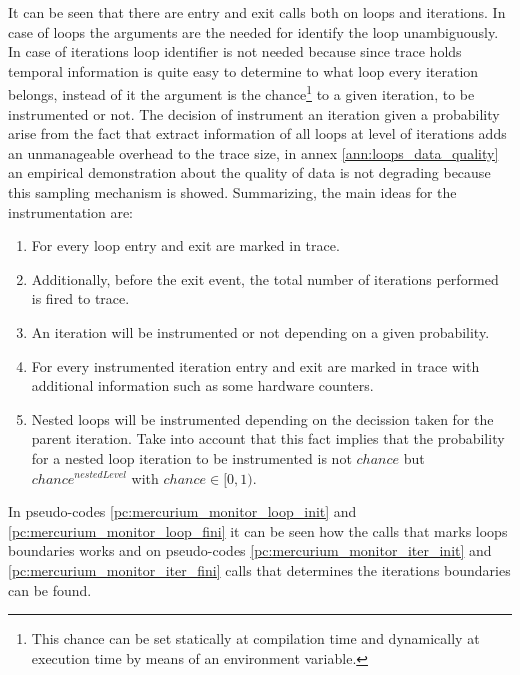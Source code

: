 It can be seen that there are entry and exit calls both on
loops and iterations. In case of loops the arguments are the needed for identify
the loop unambiguously. In case of iterations loop identifier is not needed
because since trace holds temporal information is quite easy to determine to
what loop every iteration belongs, instead of it the argument is the
chance\footnote{This chance can be set statically at compilation time and
dynamically at execution time by means of an environment variable.} to a
given iteration, to be instrumented or not. The decision of
instrument an iteration given a probability arise from the fact that extract
information of all loops at level of iterations adds an unmanageable overhead to
the trace size, in annex \ref{ann:loops_data_quality} an empirical demonstration 
about the quality of data is not degrading because this sampling mechanism is 
showed. Summarizing, the main ideas for the instrumentation are:
\begin{enumerate}[label=\roman*)]
  \item For every loop entry and exit are marked in trace.
  \item Additionally, before the exit event, the total number of iterations
    performed is fired to trace.
  \item An iteration will be instrumented or not depending on a given
    probability.
  \item For every instrumented iteration entry and exit are marked in trace 
    with additional information such as some hardware counters.
  \item Nested loops will be instrumented depending on the decission taken for
    the parent iteration. Take into account that this fact implies that the
    probability for a nested loop iteration to be instrumented is not $chance$
    but $chance^{nestedLevel}$ with $chance \in [0,1)$.
\end{enumerate}

In pseudo-codes \ref{pc:mercurium_monitor_loop_init} and
\ref{pc:mercurium_monitor_loop_fini} it can be seen how the calls that marks
loops boundaries works and on pseudo-codes
\ref{pc:mercurium_monitor_iter_init} and \ref{pc:mercurium_monitor_iter_fini}
calls that determines the iterations boundaries can be found. 

